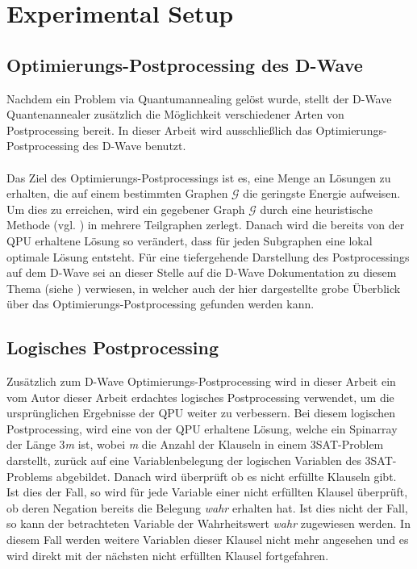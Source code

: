 
\section{Experimental Setup}


\subsection{Optimierungs-Postprocessing des D-Wave}
Nachdem ein Problem via Quantumannealing gelöst wurde, stellt der D-Wave Quantenannealer zusätzlich die Möglichkeit verschiedener Arten von Postprocessing bereit. In dieser Arbeit wird ausschließlich das Optimierungs-Postprocessing des D-Wave benutzt.\\\\Das Ziel des Optimierungs-Postprocessings ist es, eine Menge an Lösungen zu erhalten, die auf einem bestimmten Graphen $\mathcal{G}$ die geringste Energie aufweisen. Um dies zu erreichen, wird ein gegebener Graph $\mathcal{G}$ durch eine heuristische Methode (vgl. \cite{markowitz1957elimination}) in mehrere Teilgraphen zerlegt. Danach wird die bereits von der QPU erhaltene Lösung so verändert, dass für jeden Subgraphen eine lokal optimale Lösung entsteht. Für eine tiefergehende Darstellung des Postprocessings auf dem D-Wave sei an dieser Stelle auf die D-Wave Dokumentation zu diesem Thema (siehe \cite{dwavepostprocessing}) verwiesen, in welcher auch der hier dargestellte grobe Überblick über das Optimierungs-Postprocessing gefunden werden kann.
\subsection{Logisches Postprocessing}
Zusätzlich zum D-Wave Optimierungs-Postprocessing wird in dieser Arbeit ein vom Autor dieser Arbeit erdachtes logisches Postprocessing verwendet, um die ursprünglichen Ergebnisse der QPU weiter zu verbessern. Bei diesem logischen Postprocessing, wird eine von der QPU erhaltene Lösung, welche ein Spinarray der Länge 3\emph{m} ist, wobei \emph{m} die Anzahl der Klauseln in einem 3SAT-Problem darstellt, zurück auf eine Variablenbelegung der logischen Variablen des 3SAT-Problems abgebildet. Danach wird überprüft ob es nicht erfüllte Klauseln gibt. Ist dies der Fall, so wird für jede Variable einer nicht erfüllten Klausel überprüft, ob deren Negation bereits die Belegung \emph{wahr} erhalten hat. Ist dies nicht der Fall, so kann der betrachteten Variable der Wahrheitswert \emph{wahr} zugewiesen werden. In diesem Fall werden weitere Variablen dieser Klausel nicht mehr angesehen und es wird direkt mit der nächsten nicht erfüllten Klausel fortgefahren.

